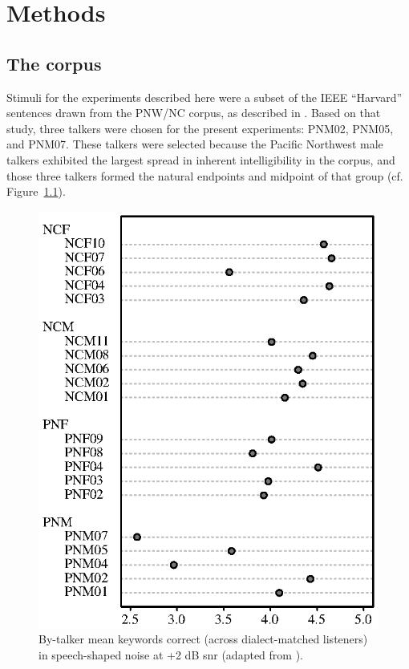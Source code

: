 \chapter{Methods}
\section{The corpus}
Stimuli for the experiments described here were a subset of the IEEE “Harvard” sentences \citep{HarvardSents} drawn from the PNW/NC corpus, as described in \citet{McCloyEtAl2013}.  Based on that study, three talkers were chosen for the present experiments: PNM02, PNM05, and PNM07.  These talkers were selected because the Pacific Northwest male talkers exhibited the largest spread in inherent intelligibility in the corpus, and those three talkers formed the natural endpoints and midpoint of that group (cf. Figure~\ref{fig:dotchart}).

\begin{figure}
	\begin{centering}
	\includegraphics{figures/dotchart.eps}
	\caption[Intelligibility of talkers used to make the stimuli]{By-talker mean keywords correct (across dialect-matched listeners) in speech-shaped noise at +2 dB \ac{snr} (adapted from \citet{McCloyEtAl2013}).\label{fig:dotchart}}
	\end{centering}
\end{figure}

